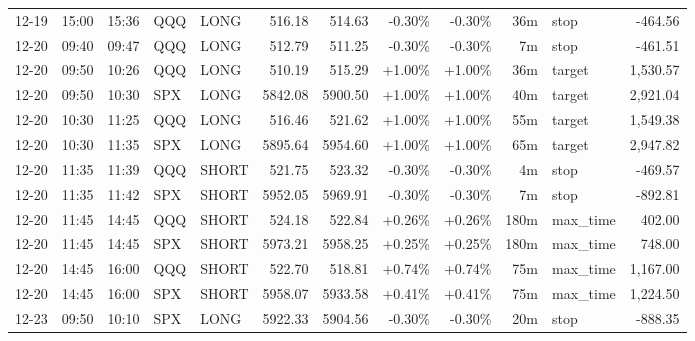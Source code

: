 \documentclass[11pt,a4paper,twoside]{article}
\begin{document}
\begin{center}
\begin{longtable}{>{\color{txtmain}}l l l l l r r r r r >{\color{txtmain}}l r}
12-19 & 15:00 & 15:36 & QQQ & LONG & 516.18 & 514.63 & \textcolor{lossred}{-0.30\%} & \textcolor{lossred}{-0.30\%} & 36m & stop & \textcolor{lossred}{-464.56} \\
12-20 & 09:40 & 09:47 & QQQ & LONG & 512.79 & 511.25 & \textcolor{lossred}{-0.30\%} & \textcolor{lossred}{-0.30\%} & 7m & stop & \textcolor{lossred}{-461.51} \\
12-20 & 09:50 & 10:26 & QQQ & LONG & 510.19 & 515.29 & \textcolor{wingreen}{+1.00\%} & \textcolor{wingreen}{+1.00\%} & 36m & target & \textcolor{wingreen}{1,530.57} \\
12-20 & 09:50 & 10:30 & SPX & LONG & 5842.08 & 5900.50 & \textcolor{wingreen}{+1.00\%} & \textcolor{wingreen}{+1.00\%} & 40m & target & \textcolor{wingreen}{2,921.04} \\
12-20 & 10:30 & 11:25 & QQQ & LONG & 516.46 & 521.62 & \textcolor{wingreen}{+1.00\%} & \textcolor{wingreen}{+1.00\%} & 55m & target & \textcolor{wingreen}{1,549.38} \\
12-20 & 10:30 & 11:35 & SPX & LONG & 5895.64 & 5954.60 & \textcolor{wingreen}{+1.00\%} & \textcolor{wingreen}{+1.00\%} & 65m & target & \textcolor{wingreen}{2,947.82} \\
12-20 & 11:35 & 11:39 & QQQ & SHORT & 521.75 & 523.32 & \textcolor{lossred}{-0.30\%} & \textcolor{lossred}{-0.30\%} & 4m & stop & \textcolor{lossred}{-469.57} \\
12-20 & 11:35 & 11:42 & SPX & SHORT & 5952.05 & 5969.91 & \textcolor{lossred}{-0.30\%} & \textcolor{lossred}{-0.30\%} & 7m & stop & \textcolor{lossred}{-892.81} \\
12-20 & 11:45 & 14:45 & QQQ & SHORT & 524.18 & 522.84 & \textcolor{wingreen}{+0.26\%} & \textcolor{wingreen}{+0.26\%} & 180m & max\_time & \textcolor{wingreen}{402.00} \\
12-20 & 11:45 & 14:45 & SPX & SHORT & 5973.21 & 5958.25 & \textcolor{wingreen}{+0.25\%} & \textcolor{wingreen}{+0.25\%} & 180m & max\_time & \textcolor{wingreen}{748.00} \\
12-20 & 14:45 & 16:00 & QQQ & SHORT & 522.70 & 518.81 & \textcolor{wingreen}{+0.74\%} & \textcolor{wingreen}{+0.74\%} & 75m & max\_time & \textcolor{wingreen}{1,167.00} \\
12-20 & 14:45 & 16:00 & SPX & SHORT & 5958.07 & 5933.58 & \textcolor{wingreen}{+0.41\%} & \textcolor{wingreen}{+0.41\%} & 75m & max\_time & \textcolor{wingreen}{1,224.50} \\
12-23 & 09:50 & 10:10 & SPX & LONG & 5922.33 & 5904.56 & \textcolor{lossred}{-0.30\%} & \textcolor{lossred}{-0.30\%} & 20m & stop & \textcolor{lossred}{-888.35} \\

\end{longtable}
\end{center}
\end{document}
